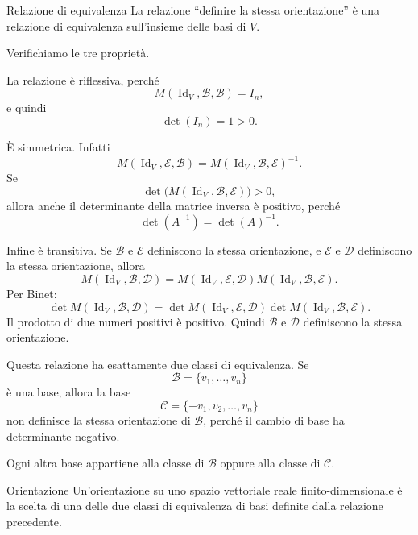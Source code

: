 \documentclass[a4paper]{article}
\begin{document}
\begin{snippetproposition}{Relazione di equivalenza}
    La relazione “definire la stessa orientazione” è una relazione di equivalenza sull'insieme delle basi di \(V\).
\end{snippetproposition}

\begin{snippetproof}{}
    Verifichiamo le tre proprietà.

    La relazione è riflessiva, perché
    \[
        M(\operatorname{Id}_V,\mathcal{B},\mathcal{B})=I_n,
    \]
    e quindi
    \[
        \det(I_n)=1>0.
    \]

    È simmetrica. Infatti
    \[
        M(\operatorname{Id}_V,\mathcal{E},\mathcal{B})
        =
        M(\operatorname{Id}_V,\mathcal{B},\mathcal{E})^{-1}.
    \]
    Se
    \[
        \det\bigl(M(\operatorname{Id}_V,\mathcal{B},\mathcal{E})\bigr)>0,
    \]
    allora anche il determinante della matrice inversa è positivo, perché
    \[
        \det(A^{-1})=\det(A)^{-1}.
    \]

    Infine è transitiva. Se \(\mathcal{B}\) e \(\mathcal{E}\) definiscono la stessa orientazione, e \(\mathcal{E}\) e \(\mathcal{D}\) definiscono la stessa orientazione, allora
    \[
        M(\operatorname{Id}_V,\mathcal{B},\mathcal{D})
        =
        M(\operatorname{Id}_V,\mathcal{E},\mathcal{D})
        M(\operatorname{Id}_V,\mathcal{B},\mathcal{E}).
    \]
    Per Binet:
    \[
        \det M(\operatorname{Id}_V,\mathcal{B},\mathcal{D})
        =
        \det M(\operatorname{Id}_V,\mathcal{E},\mathcal{D})
        \det M(\operatorname{Id}_V,\mathcal{B},\mathcal{E}).
    \]
    Il prodotto di due numeri positivi è positivo. Quindi \(\mathcal{B}\) e \(\mathcal{D}\) definiscono la stessa orientazione.
\end{snippetproof}

Questa relazione ha esattamente due classi di equivalenza. Se
\[
    \mathcal{B}=\{v_1,\ldots,v_n\}
\]
è una base, allora la base
\[
    \mathcal{C}=\{-v_1,v_2,\ldots,v_n\}
\]
non definisce la stessa orientazione di \(\mathcal{B}\), perché il cambio di base ha determinante negativo.

Ogni altra base appartiene alla classe di \(\mathcal{B}\) oppure alla classe di \(\mathcal{C}\).

\begin{snippetdefinition}{Orientazione}
    Un'orientazione su uno spazio vettoriale reale finito-dimensionale è la scelta di una delle due classi di equivalenza di basi definite dalla relazione precedente.
\end{snippetdefinition}
\end{document}
